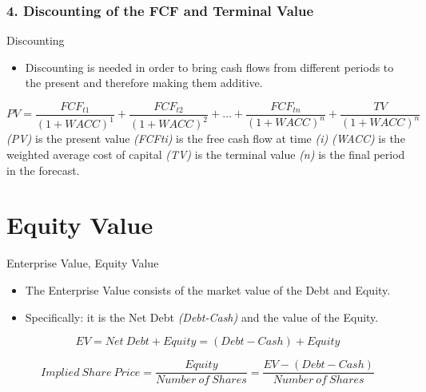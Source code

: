 \documentclass[serif, aspectratio=169]{beamer}
\begin{document}
\begin{frame}
	\frametitle<presentation>{4. Discounting of the FCF and Terminal Value}
\begin{block}{Discounting}
		\begin{itemize}
			\item Discounting is needed in order to bring cash flows from different periods to the present and therefore making them additive. 
    \end{itemize}
    \begin{equation*}
PV = \frac{{FCF_{t1}}}{{(1 + WACC)^1}} + \frac{{FCF_{t2}}}{{(1 + WACC)^2}} + \ldots + \frac{{FCF_{tn}}}{{(1 + WACC)^n}} + \frac{{TV}}{{(1 + WACC)^n}}
    \end{equation*}
\textit{(PV)} is the present value
\textit{(FCF{ti})} is the free cash flow at time \textit{(i)}
\textit{(WACC)} is the weighted average cost of capital
\textit{(TV)} is the terminal value
\textit{(n) }is the final period in the forecast.
	\end{block}
\end{frame}

\section{Equity Value}
\begin{frame}{Enterprise Value, Equity Value}
    \begin{itemize}
        \item The Enterprise Value consists of the market value of the Debt and Equity.
        \item Specifically: it is the Net Debt \textit{(Debt-Cash)} and the value of the Equity. 
    \end{itemize}
  \begin{equation*}
    EV = Net\ Debt + Equity = (Debt - Cash) + Equity
    \end{equation*}

      \begin{equation*}
  Implied\ Share\ Price = \frac{{Equity}}{{Number\ of\ Shares}} = \frac{{EV - (Debt - Cash)}}{{Number\ of\ Shares}}
    \end{equation*}
\end{frame}
\end{document}
